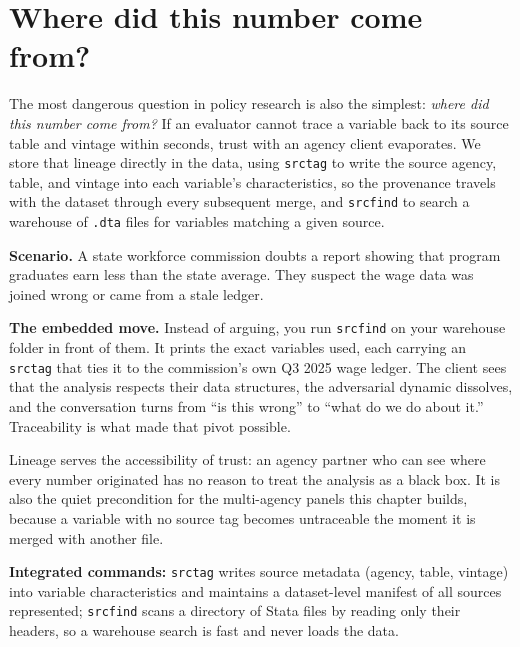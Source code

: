 \documentclass[
    a4paper,
    fontsize=10pt,
    twoside=true,
    numbers=noenddot,
]{kaobook}
\newcounter{appliedexample}
\newenvironment{appliedexample}[1][]{%
    \refstepcounter{appliedexample}%
    \begin{appliedexamplebox}[frametitle={Applied Example~\theappliedexample.~~#1}]%
}{%
    \end{appliedexamplebox}%
}
\begin{document}
\section{Where did this number come from?}\label{sec:lineage}
The most dangerous question in policy research is also the simplest: \emph{where did this number come from?} If an evaluator cannot trace a variable back to its source table and vintage within seconds, trust with an agency client evaporates. We store that lineage directly in the data, using \texttt{srctag} to write the source agency, table, and vintage into each variable's characteristics, so the provenance travels with the dataset through every subsequent merge, and \texttt{srcfind} to search a warehouse of \texttt{.dta} files for variables matching a given source.

\begin{appliedexample}[Proving lineage to a skeptical agency]
\textbf{Scenario.} A state workforce commission doubts a report showing that program graduates earn less than the state average. They suspect the wage data was joined wrong or came from a stale ledger.

\medskip
\textbf{The embedded move.} Instead of arguing, you run \texttt{srcfind} on your warehouse folder in front of them. It prints the exact variables used, each carrying an \texttt{srctag} that ties it to the commission's own Q3 2025 wage ledger. The client sees that the analysis respects their data structures, the adversarial dynamic dissolves, and the conversation turns from \enquote{is this wrong} to \enquote{what do we do about it.} Traceability is what made that pivot possible.
\end{appliedexample}

Lineage serves the accessibility of trust: an agency partner who can see where every number originated has no reason to treat the analysis as a black box. It is also the quiet precondition for the multi-agency panels this chapter builds, because a variable with no source tag becomes untraceable the moment it is merged with another file.

\begin{kaobox}[frametitle=Package Integration: \texttt{srctag} and \texttt{srcfind}]
\textbf{Integrated commands:} \texttt{srctag} writes source metadata (agency, table, vintage) into variable characteristics and maintains a dataset-level manifest of all sources represented; \texttt{srcfind} scans a directory of Stata files by reading only their headers, so a warehouse search is fast and never loads the data.
\end{kaobox}
\end{document}
